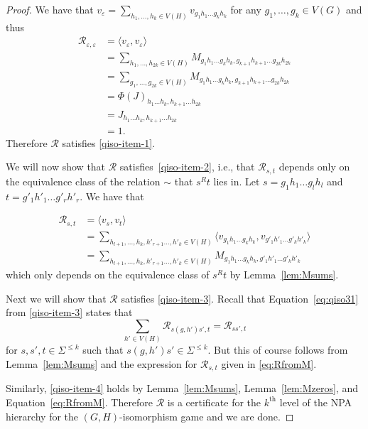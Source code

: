 \documentclass[11pt,a4paper]{article}
\theoremstyle{plain}
\theoremstyle{remark}
\theoremstyle{definition}
\renewcommand\epsilon\varepsilon
\begin{document}
\begin{proof}
We have that $v_\epsilon = \sum_{h_1,\ldots, h_k \in V(H)} v_{g_1h_1\ldots g_kh_k}$ for any $g_1, \ldots, g_k \in V(G)$ and thus
\begin{align*}
     \mathcal{R}_{\epsilon,\epsilon} &= \langle v_\epsilon, v_\epsilon \rangle \\
     &= \sum_{h_1, \ldots, h_{2k} \in V(H)} M_{g_1h_1\ldots g_kh_k,g_{k+1}h_{k+1}\ldots g_{2k}h_{2k}} \\
     &= \sum_{g_1, \ldots, g_{2k} \in V(H)} M_{g_1h_1\ldots g_kh_k,g_{k+1}h_{k+1}\ldots g_{2k}h_{2k}} \\
     &= \Phi(J)_{h_1\ldots h_k,h_{k+1}\ldots h_{2k}} \\
     &= J_{h_1\ldots h_k,h_{k+1}\ldots h_{2k}} \\
     &= 1.
\end{align*}
Therefore $\mathcal{R}$ satisfies \ref{qiso-item-1}.

We will now show that $\mathcal{R}$ satisfies~\ref{qiso-item-2}, i.e., that $\mathcal{R}_{s,t}$ depends only on the equivalence class of the relation $\sim$ that $s^Rt$ lies in. Let $s = g_1h_1\ldots g_lh_l$ and $t = g'_1h'_1\ldots g'_rh'_r$. We have that

\begin{align}
    \mathcal{R}_{s,t} &= \langle v_s, v_t \rangle \\
    &= \sum_{h_{l+1}, \ldots, h_k, h'_{r+1} \ldots, h'_k \in V(H)} \langle v_{g_1h_1\ldots g_kh_k}, v_{g'_1h'_1\ldots g'_kh'_k} \rangle \\
    &= \sum_{h_{l+1}, \ldots, h_k, h'_{r+1} \ldots, h'_k \in V(H)} M_{g_1h_1\ldots g_kh_k, g'_1h'_1\ldots g'_kh'_k} \label{eq:RfromM}
\end{align}
which only depends on the equivalence class of $s^Rt$ by Lemma~\ref{lem:Msums}.

Next we will show that $\mathcal{R}$ satisfies \ref{qiso-item-3}. Recall that Equation~\eqref{eq:qiso31} from \ref{qiso-item-3} states that
\[\sum_{h' \in V(H)} \mathcal{R}_{s(g,h')s',t} = \mathcal{R}_{ss',t}\]
for $s,s',t \in \Sigma^{\le k}$ such that $s(g,h')s' \in \Sigma^{\le k}$. But this of course follows from Lemma~\ref{lem:Msums} and the expression for $\mathcal{R}_{s,t}$ given in \eqref{eq:RfromM}. 

Similarly, \ref{qiso-item-4} holds by Lemma~\ref{lem:Msums}, Lemma~\ref{lem:Mzeros}, and Equation~\eqref{eq:RfromM}. Therefore $\mathcal{R}$ is a certificate for the $k^\text{th}$ level of the NPA hierarchy for the $(G,H)$-isomorphism game and we are done.
\end{proof}
\end{document}
